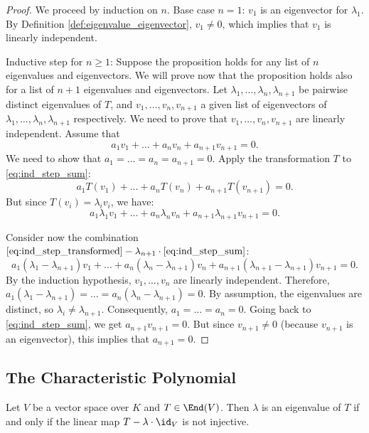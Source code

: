 \begin{proof}
  We proceed by induction on $n$.
  Base case $n=1$: $v_1$ is an eigenvector for $\lambda_1$. By Definition \ref{def:eigenvalue_eigenvector}, $v_1 \ne 0$, which implies that $v_1$ is linearly independent.

  Inductive step for $n \ge 1$: Suppose the proposition holds for any list of $n$ eigenvalues and eigenvectors. We will prove now that the proposition holds also for a list of $n+1$ eigenvalues and eigenvectors.
  Let $\lambda_1, \dots, \lambda_n, \lambda_{n+1}$ be pairwise distinct eigenvalues of $T$, and $v_1, \dots, v_n, v_{n+1}$ a given list of eigenvectors of $\lambda_1, \dots, \lambda_n, \lambda_{n+1}$ respectively. We need to prove that $v_1, \dots, v_n, v_{n+1}$ are linearly independent.
  Assume that
  \begin{equation} \label{eq:ind_step_sum}
    a_1 v_1 + \dots + a_n v_n + a_{n+1} v_{n+1} = 0.
  \end{equation}
  We need to show that $a_1 = \dots = a_n = a_{n+1} = 0$.
  Apply the transformation $T$ to \eqref{eq:ind_step_sum}:
  \[ a_1 T(v_1) + \dots + a_n T(v_n) + a_{n+1} T(v_{n+1}) = 0. \]
  But since $T(v_i) = \lambda_i v_i$, we have:
  \begin{equation} \label{eq:ind_step_transformed}
    a_1 \lambda_1 v_1 + \dots + a_n \lambda_n v_n + a_{n+1} \lambda_{n+1} v_{n+1} = 0.
  \end{equation}

  Consider now the combination $\eqref{eq:ind_step_transformed} - \lambda_{n+1} \cdot \eqref{eq:ind_step_sum}$:
  \[ a_1(\lambda_1 - \lambda_{n+1})v_1 + \dots + a_n(\lambda_n - \lambda_{n+1})v_n + a_{n+1}(\lambda_{n+1} - \lambda_{n+1})v_{n+1} = 0. \]
  By the induction hypothesis, $v_1, \dots, v_n$ are linearly independent.
  Therefore, $a_1(\lambda_1 - \lambda_{n+1}) = \dots = a_n(\lambda_n - \lambda_{n+1}) = 0$.
  By assumption, the eigenvalues are distinct, so $\lambda_i \ne \lambda_{n+1}$. Consequently, $a_1 = \dots = a_n = 0$.
  Going back to \eqref{eq:ind_step_sum}, we get $a_{n+1} v_{n+1} = 0$.
  But since $v_{n+1} \ne 0$ (because $v_{n+1}$ is an eigenvector), this implies that $a_{n+1} = 0$.
\end{proof}

\subsection{The Characteristic Polynomial}

\begin{proposition}\label{prop:eigen_injective}
  Let $V$ be a vector space over $K$ and $T \in \End(V)$. Then $\lambda$ is an eigenvalue of $T$ if and only if the linear map $T - \lambda \cdot \id_V$ is not injective.
\end{proposition}

